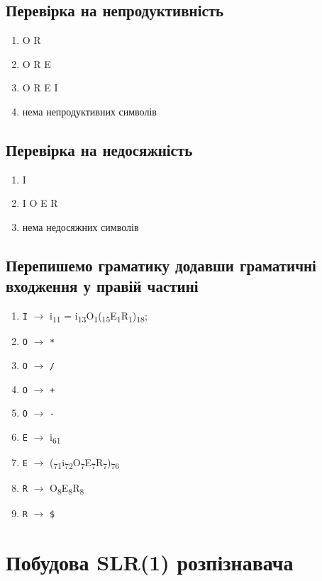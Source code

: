 \subsection{Перевірка на непродуктивність}
\begin{enumerate}
    \item  O R
    \item  O R E 
    \item  O R E I
    \item  нема непродуктивних символів
\end{enumerate}

\subsection{Перевірка на недосяжність}
\begin{enumerate}
    \item  I
    \item  I O E R
    \item  нема недосяжних символів
\end{enumerate}

\clearpage
\subsection{Перепишемо граматику додавши граматичні входження у правій частині}
\begin{enumerate}
    \item  \verb|I| $\to$ i\textsubscript{11} = i\textsubscript{13}O\textsubscript{1}(\textsubscript{15}E\textsubscript{1}R\textsubscript{1})\textsubscript{18};
    \item  \verb|O| $\to$ \verb|*|
    \item  \verb|O| $\to$ \verb|/|
    \item  \verb|O| $\to$ \verb|+|
    \item  \verb|O| $\to$ \verb|-|
    \item  \verb|E| $\to$ i\textsubscript{61}
    \item  \verb|E| $\to$ (\textsubscript{71}i\textsubscript{72}O\textsubscript{7}E\textsubscript{7}R\textsubscript{7})\textsubscript{76}
    \item  \verb|R| $\to$ O\textsubscript{8}E\textsubscript{8}R\textsubscript{8}
    \item  \verb|R| $\to$ \verb|$|
\end{enumerate}


\section{Побудова SLR(1) розпізнавача}
